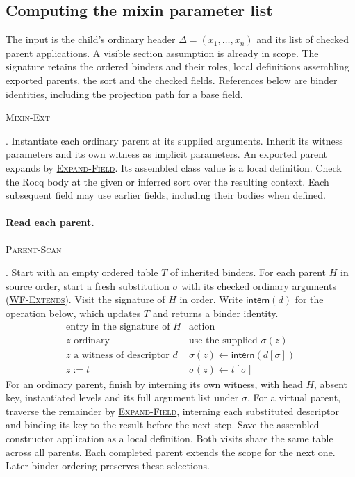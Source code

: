 \documentclass{article}
\newcommand{\rdefn}[1]{\hypertarget{rule-#1}{\textsc{#1}}}
\newcommand{\ruse}[1]{\hyperlink{rule-#1}{\textsc{#1}}}
\begin{document}
\subsection{Computing the mixin parameter list}
\label{sec:mixin-parameters}
The input is the child's ordinary header $\Delta=(x_1,\ldots,x_n)$
and its list of checked parent applications. A visible section assumption
is already in scope. The signature retains the ordered binders and their roles, local
definitions assembling exported parents, the sort and the checked fields. References below
are binder identities, including the projection path for a base field.

\rdefn{Mixin-Ext}. Instantiate each ordinary parent at its supplied
arguments. Inherit its witness parameters and its own witness as implicit
parameters. An exported parent expands by \ruse{Expand-Field}. Its
assembled class value is a local definition. Check the Rocq body at the
given or inferred sort over the resulting context. Each subsequent
field may use earlier fields, including their bodies when defined.

\paragraph{Read each parent.}
\rdefn{Parent-Scan}. Start with an empty ordered table $T$ of inherited
binders. For each parent $H$ in source order, start a fresh substitution
$\sigma$ with its checked ordinary arguments (\ruse{WF-Extends}).
Visit the signature of $H$ in order. Write $\mathsf{intern}(d)$ for the
operation below, which updates $T$ and returns a binder identity.
\[
\begin{array}{ll}
 \text{entry in the signature of }H & \text{action}\\ \hline
 z\text{ ordinary} & \text{use the supplied }\sigma(z)\\
 z\text{ a witness of descriptor }d &
       \sigma(z)\gets\mathsf{intern}(d[\sigma])\\
 z:=t & \sigma(z)\gets t[\sigma]
\end{array}
\]
For an ordinary parent, finish by interning its own witness, with head
$H$, absent key, instantiated levels and its full argument list under
$\sigma$. For a virtual parent, traverse the remainder by
\ruse{Expand-Field}, interning each substituted descriptor and binding
its key to the result before the next step. Save the assembled
constructor application as a local definition. Both visits share the
same table across all parents. Each completed parent extends the scope
for the next one. Later binder ordering preserves these selections.
\end{document}
